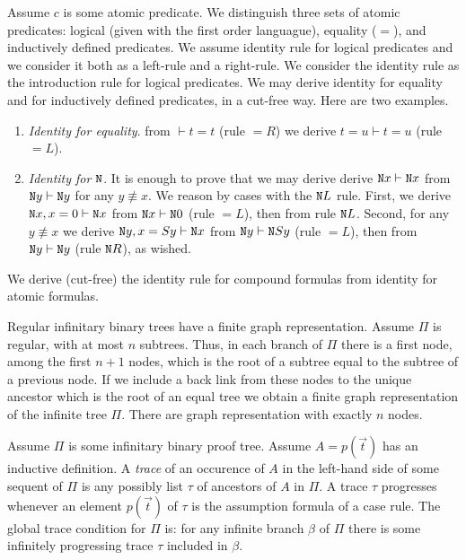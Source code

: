 \documentclass[a4paper,12pt]{article}
\newcommand{\Nat}               { {\tt N}  }
\newcommand{\FV}              { {\tt FV} }
\newcommand{\eqL}     {= \! \!  \!  L}
\begin{document}
Assume $c$ is some atomic predicate. We distinguish three sets of atomic predicates: logical (given with the first order languague), equality ($=$), and inductively defined predicates. We assume identity rule for logical predicates and we consider it both as a left-rule and a right-rule. We consider the identity rule as the introduction rule for logical predicates. We may derive identity for equality and for inductively defined predicates, in a cut-free way. Here are two examples. 
\begin{enumerate}
\item
\emph{Identity for equality}.
from $\vdash t=t$ (rule $= \! \!  \!  R$) we derive $t=u \vdash t=u$ (rule $\eqL$).
\item
\emph{Identity for $\Nat$}. 
It is enough to prove that we may derive derive $\Nat x \vdash \Nat x$ from $\Nat y \vdash \Nat y$ for any $y \not \equiv x$. We reason by cases with the $\Nat L$ rule. First, we derive $\Nat x, x=0 \vdash \Nat x$ from $\Nat x \vdash \Nat 0$ (rule $\eqL$), then from rule $\Nat L$. Second, for any $y \not \equiv x$ we derive $\Nat y, x = Sy \vdash \Nat x$ from $\Nat y \vdash \Nat Sy$ (rule $\eqL$), then from $\Nat y \vdash \Nat y$ (rule $\Nat R$), as wished.
\end{enumerate}
We derive (cut-free) the identity rule for compound formulas from identity for atomic formulas.


Regular infinitary binary trees have a finite graph representation. Assume $\Pi$ is regular, with at most $n$ subtrees. Thus, in each branch of $\Pi$ there is a first node, among the first $n+1$ nodes, which is the root of a subtree equal to the subtree of a previous node. If we include a back link from these nodes to the unique ancestor which is the root of an equal tree we obtain a finite graph representation of the infinite tree $\Pi$. There are graph representation with exactly $n$ nodes.

Assume $\Pi$ is some infinitary binary proof tree. Assume $A = p(\vec{t})$ has an inductive definition. A \emph{trace} of an occurence of $A$ in the left-hand side of some sequent of $\Pi$ is any possibly list $\tau$ of ancestors of $A$ in $\Pi$. A trace $\tau$ progresses whenever an element $p(\vec{t})$ of $\tau$ is the assumption formula of a case rule. The global trace condition for $\Pi$ is: for any infinite branch $\beta$ of $\Pi$ there is some infinitely progressing trace $\tau$ included in $\beta$. 
\end{document}
